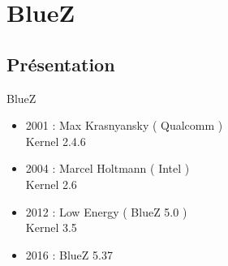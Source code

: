 \section{BlueZ}
\subsection{Présentation}
\begin{frame}
\begin{center}
\huge BlueZ
\end{center}
\begin{itemize}
	\item 2001 : Max Krasnyansky ( Qualcomm ) \\ Kernel 2.4.6
	\item 2004 : Marcel Holtmann ( Intel )\\ Kernel 2.6
	\item 2012 : Low Energy ( BlueZ 5.0 ) \\ Kernel 3.5
	\item 2016 : BlueZ 5.37
\end{itemize}
\end{frame}

